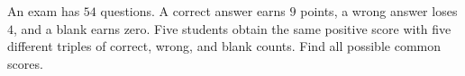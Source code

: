 An exam has $54$ questions. A correct answer earns $9$ points, a wrong answer loses $4$, and a blank earns zero. Five students obtain the same positive score with five different triples of correct, wrong, and blank counts. Find all possible common scores.
